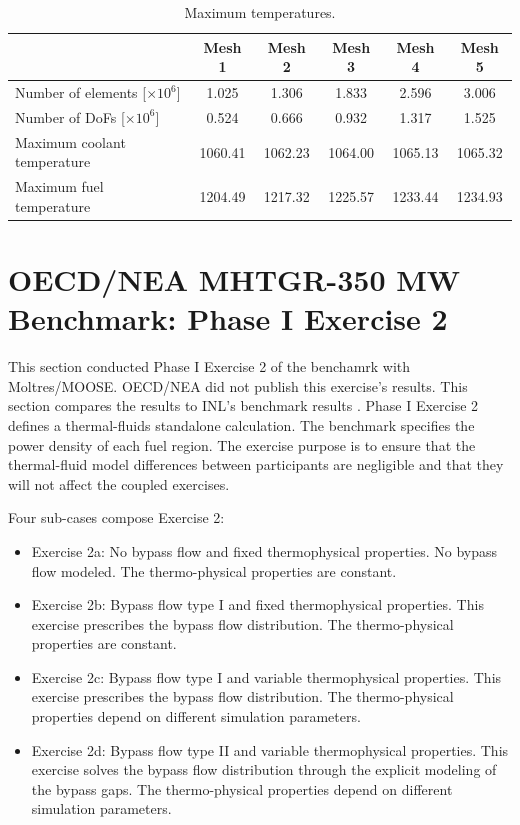 \begin{table}[htbp!]
  \centering
  \caption{Maximum temperatures.}
  \label{tab:th-full-assem-results}
\begin{tabular}{l|ccccc}
\toprule
                            & Mesh 1 & Mesh 2 & Mesh 3 & Mesh 4 & Mesh 5 \\
\midrule
Number of elements [$\times 10^{6}$]  & 1.025 & 1.306 & 1.833 & 2.596 & 3.006 \\
Number of DoFs [$\times 10^{6}$]      & 0.524 & 0.666 & 0.932 & 1.317 & 1.525 \\
Maximum coolant temperature & 1060.41 & 1062.23 & 1064.00 & 1065.13 & 1065.32 \\
Maximum fuel temperature    & 1204.49 & 1217.32 & 1225.57 & 1233.44 & 1234.93 \\
\bottomrule
\end{tabular}
\end{table}


\section{OECD/NEA MHTGR-350 MW Benchmark: Phase I Exercise 2}

This section conducted Phase I Exercise 2 of the benchamrk with Moltres/MOOSE.
OECD/NEA did not publish this exercise's results.
This section compares the results to INL's benchmark results \cite{strydom_inl_2013}.
Phase I Exercise 2 defines a thermal-fluids standalone calculation.
The benchmark specifies the power density of each fuel region.
The exercise purpose is to ensure that the thermal-fluid model differences between participants are negligible and that they will not affect the coupled exercises.

Four sub-cases compose Exercise 2:
\begin{itemize}
  \item Exercise 2a: No bypass flow and fixed thermophysical properties. No bypass flow modeled. The thermo-physical properties are constant.
  \item Exercise 2b: Bypass flow type I and fixed thermophysical properties. This exercise prescribes the bypass flow distribution. The thermo-physical properties are constant.
  \item Exercise 2c: Bypass flow type I and variable thermophysical properties. This exercise prescribes the bypass flow distribution. The thermo-physical properties depend on different simulation parameters.
  \item Exercise 2d: Bypass flow type II and variable thermophysical properties. This exercise solves the bypass flow distribution through the explicit modeling of the bypass gaps. The thermo-physical properties depend on different simulation parameters.
\end{itemize}

